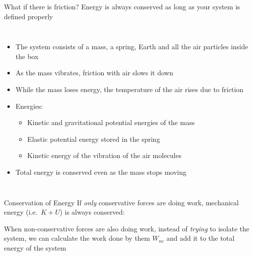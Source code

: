 \documentclass[12pt,compress,aspectratio=169]{beamer}
\newcommand{\eq}[2]{\vspace{#1}{\Large\begin{displaymath}#2\end{displaymath}}}
\begin{document}
\begin{frame}{What if there is friction?}
  Energy is always conserved as long as your system is defined properly
  \begin{columns}
    \begin{itemize}
    \item The system consists of a mass, a spring, Earth and all the air
      particles inside the box
    \item As the mass vibrates, friction with air slows it down
    \item While the mass loses energy, the temperature of the air rises due to
      friction
    \item Energies:
      \begin{itemize}
      \item Kinetic and gravitational potential energies of the mass
      \item Elastic potential energy stored in the spring
      \item Kinetic energy of the vibration of the air molecules
      \end{itemize}
    \item Total energy is conserved even as the mass stops moving
    \end{itemize}
  \end{columns}
\end{frame}



\begin{frame}{Conservation of Energy}
  If \emph{only} conservative forces are doing work, mechanical energy (i.e.\
  $K+U$) is always conserved:

  \eq{-.2in}{
    \boxed{K +U =K'+U'}
  }
  
  When non-conservative forces are also doing work, instead of
  \emph{trying} to isolate the system, we can calculate the work done by them
  $W_{nc}$ and add it to the total energy of the system
    
  \eq{-.2in}{
    \boxed{K+U+W_{nc}=K'+U'}
  }
\end{frame}
\end{document}
